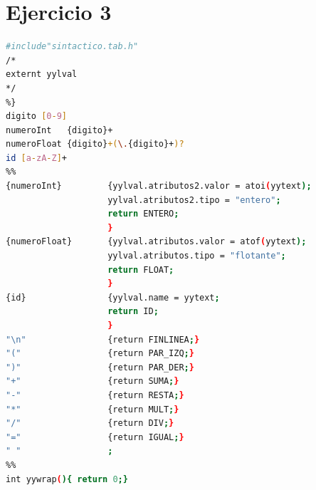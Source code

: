 \documentclass[12pt]{article}
\begin{document}
\section{Ejercicio 3}

\begin{lstlisting}[language=bash,frame=single,style=CStyle,caption={lexico.l}]
%{
#include"sintactico.tab.h"
/*
externt yylval
*/
%}
digito [0-9]
numeroInt   {digito}+
numeroFloat {digito}+(\.{digito}+)?
id [a-zA-Z]+
%%
{numeroInt}         {yylval.atributos2.valor = atoi(yytext);
                    yylval.atributos2.tipo = "entero";   
                    return ENTERO;
                    }
{numeroFloat}       {yylval.atributos.valor = atof(yytext);
                    yylval.atributos.tipo = "flotante";   
                    return FLOAT;
                    }
{id}                {yylval.name = yytext; 
                    return ID;
                    }
"\n"                {return FINLINEA;}
"("                 {return PAR_IZQ;}
")"                 {return PAR_DER;}
"+"                 {return SUMA;}
"-"                 {return RESTA;}
"*"                 {return MULT;}
"/"                 {return DIV;}
"="                 {return IGUAL;}
" "                 ;
%%
int yywrap(){ return 0;}
\end{lstlisting}
\end{document}

